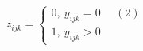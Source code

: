 \documentclass[12pt]{article}
\begin{document}
$$
z_{ijk} = 
\begin{cases}
0, \ y_{ijk} = 0 \ \ \ \ \ \  (2) \\
1, \ y_{ijk} > 0  
\end{cases}
$$
\end{document}
